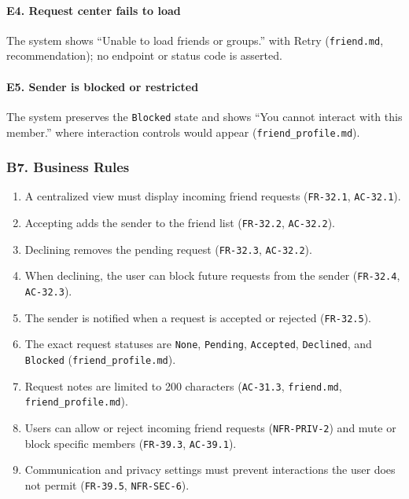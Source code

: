 \documentclass[12pt]{article}
\begin{document}
\paragraph*{E4. Request center fails to load}
\par\medskip

The system shows “Unable to load friends or groups.” with Retry (\texttt{friend.md}, recommendation); no endpoint or status code is asserted.
\par\medskip

\hypertarget{sec:e5-sender-is-blocked-or-restricted}{}
\paragraph*{E5. Sender is blocked or restricted}
\par\medskip

The system preserves the \texttt{Blocked} state and shows “You cannot interact with this member.” where interaction controls would appear (\texttt{friend\_profile.md}).
\par\medskip

\hypertarget{sec:b7-business-rules}{}
\subsubsection*{B7. Business Rules}
\par\medskip

\begin{enumerate}
\item A centralized view must display incoming friend requests (\texttt{FR-32.1}, \texttt{AC-32.1}).
\item Accepting adds the sender to the friend list (\texttt{FR-32.2}, \texttt{AC-32.2}).
\item Declining removes the pending request (\texttt{FR-32.3}, \texttt{AC-32.2}).
\item When declining, the user can block future requests from the sender (\texttt{FR-32.4}, \texttt{AC-32.3}).
\item The sender is notified when a request is accepted or rejected (\texttt{FR-32.5}).
\item The exact request statuses are \texttt{None}, \texttt{Pending}, \texttt{Accepted}, \texttt{Declined}, and \texttt{Blocked} (\texttt{friend\_profile.md}).
\item Request notes are limited to 200 characters (\texttt{AC-31.3}, \texttt{friend.md}, \texttt{friend\_profile.md}).
\item Users can allow or reject incoming friend requests (\texttt{NFR-PRIV-2}) and mute or block specific members (\texttt{FR-39.3}, \texttt{AC-39.1}).
\item Communication and privacy settings must prevent interactions the user does not permit (\texttt{FR-39.5}, \texttt{NFR-SEC-6}).
\end{enumerate}
\par\medskip
\end{document}
